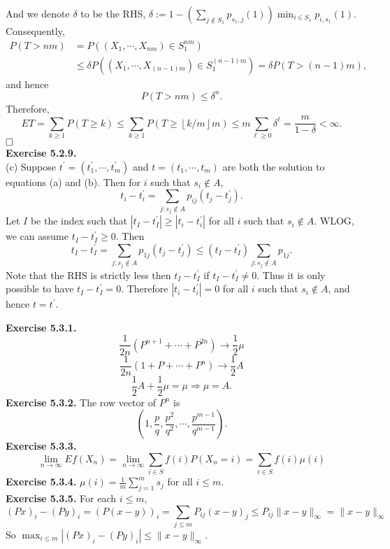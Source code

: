 \documentclass[12pt]{extarticle}
\begin{document}
And we denote $\delta$ to be the RHS, $\delta:=1-\left(
\sum_{j\notin S_1}p_{s_1,j}(1)
\right)
\min_{i\in S_1}p_{i,s_1}(1)$.
Consequently,
\[
\begin{aligned}
P(T>nm) &= P\left((X_1,\cdots,X_{nm})\in S_1^{nm}\right) \\&\leq
\delta
P\left(
(X_1,\cdots,X_{(n-1)m})\in S_1^{(n-1)m}
\right)
=\delta P(T>(n-1)m),
\end{aligned}
\]
and hence
\[
P(T>nm)\leq\delta^n.
\]
Therefore,
\[
ET=
\sum_{k\geq 1}P(T\geq k)
\leq
\sum_{k\geq 1}P
\left(
T\geq \left\lfloor k/m\right\rfloor m
\right)
\leq
m\sum_{\ell\geq 0}\delta^\ell
=\frac{m}{1-\delta}<\infty.
\]
$\hspace{\fill}\square$ \\
\textbf{Exercise 5.2.9.}\\
(c) Suppose $t^\prime=(t_1^\prime,\cdots,t_m^\prime)$ and $t=(t_1,\cdots,t_m)$ are both the solution to equations (a) and (b).
Then for $i$ such that $s_i\notin A$,
\[
t_i-t_i^\prime
=
\sum_{j:s_j\notin A}p_{ij}(t_j-t_j^\prime).
\]
Let $I$ be the index such that $|t_I-t_I^\prime|\geq|t_i-t_i^\prime|$ for all $i$ such that $s_i\notin A$.
WLOG, we can assume $t_I-t_I^\prime\geq 0$.
Then
\[
t_I-t_I^\prime
=
\sum_{j:s_j\notin A}p_{1j}(t_j-t_j^\prime)
\leq
(t_I-t_I^\prime)\sum_{j:s_j\notin A}p_{1j}.
\]
Note that the RHS is strictly less then $t_I-t_I^\prime$ if $t_I-t_I^\prime\neq 0$. Thus it is only possible to have $t_I-t_I^\prime=0$.
Therefore $|t_i-t_i^\prime|=0$ for all $i$ such that $s_i\notin A$, and hence $t=t^\prime$.

\newpage
\noindent
\textbf{Exercise 5.3.1.}
\[
\frac{1}{2n}\left(P^{n+1}+\cdots+P^{2n}\right)\rightarrow \frac{1}{2}\mu
\]
\[
\frac{1}{2n}\left(1+P+\cdots+P^{n}\right)\rightarrow \frac{1}{2}A
\]
\[
\frac{1}{2}A+\frac{1}{2}\mu=\mu
\Rightarrow\mu=A.
\]
\textbf{Exercise 5.3.2.}
The row vector of $P^n$ is
\[
\left(1,\frac{p}{q},\frac{p^2}{q^2},\cdots,\frac{p^{m-1}}{q^{m-1}}\right).
\]
\textbf{Exercise 5.3.3.}
\[
\lim_{n\rightarrow\infty}Ef(X_n)=\lim_{n\rightarrow\infty}\sum_{i\in S}f(i)P(X_n=i)
=
\sum_{i\in S}f(i)\mu(i)
\]
\textbf{Exercise 5.3.4.}
$\mu(i)=\frac{1}{m}\sum_{j=1}^ms_j$ for all $i\leq m$.\\
\textbf{Exercise 5.3.5.}
For each $i\leq m$,
\[
(Px)_i-(Py)_i=(P(x-y))_i=\sum_{j\leq m}P_{ij}(x-y)_j
\leq P_{ij}\|x-y\|_\infty
=
\|x-y\|_\infty
\]
So $\max_{i\leq m}\left|(Px)_i-(Py)_i\right|\leq\|x-y\|_\infty$. \\
\end{document}
